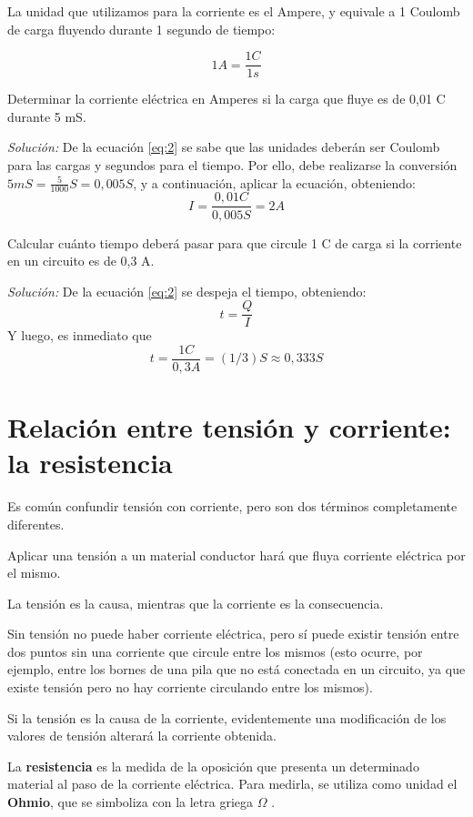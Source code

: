 La unidad que utilizamos para la corriente es el Ampere, y equivale a 1 Coulomb de carga fluyendo durante 1 segundo de tiempo:

$$ 1A = \frac{1C}{1s} $$

\begin{ejemplo}
	Determinar la corriente eléctrica en Amperes si la carga que fluye es de 0,01 C durante 5 mS.
	
	\emph{Solución:} De la ecuación \ref{eq:2} se sabe que las unidades deberán ser Coulomb para las cargas y segundos para el tiempo. Por ello, debe realizarse la conversión $5mS=\frac{5}{1000} S =0,005 S$, y a continuación, aplicar la ecuación, obteniendo: $$ I= \frac{0,01 C}{0,005 S} = 2 A $$
\end{ejemplo}

\begin{ejemplo}
	Calcular cuánto tiempo deberá pasar para que circule 1 C de carga si la corriente en un circuito es de 0,3 A.
	
	\emph{Solución:} De la ecuación \ref{eq:2} se despeja el tiempo, obteniendo: 
	\begin{equation}
		\label{eq:3}
		t=\frac{Q}{I}
	\end{equation}
	Y luego, es inmediato que $$ t=\frac{1C}{0,3A}=(1/3)S \approx 0,333 S $$
\end{ejemplo}

\section{Relación entre tensión y corriente: la resistencia}

Es común confundir tensión con corriente, pero son dos términos completamente diferentes.

Aplicar una tensión a un material conductor hará que fluya corriente eléctrica por el mismo.

La tensión es la causa, mientras que la corriente es la consecuencia.

Sin tensión no puede haber corriente eléctrica, pero sí puede existir tensión entre dos puntos sin una corriente que circule entre los mismos (esto ocurre, por ejemplo, entre los bornes de una pila que no está conectada en un circuito, ya que existe tensión pero no hay corriente circulando entre los mismos).

Si la tensión es la causa de la corriente, evidentemente una modificación de los valores de tensión alterará la corriente obtenida.

La \textbf{resistencia} es la medida de la oposición que presenta un determinado material al paso de la corriente eléctrica. Para medirla, se utiliza como unidad el \textbf{Ohmio}, que se simboliza con la letra griega $\Omega$ .
